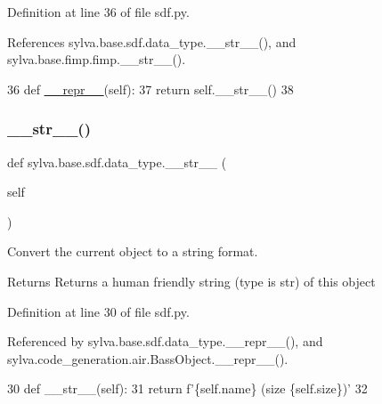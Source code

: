 Definition at line 36 of file sdf.\+py.



References sylva.\+base.\+sdf.\+data\+\_\+type.\+\_\+\+\_\+str\+\_\+\+\_\+(), and sylva.\+base.\+fimp.\+fimp.\+\_\+\+\_\+str\+\_\+\+\_\+().


\begin{DoxyCode}
36         \textcolor{keyword}{def }\hyperlink{namespacesylva_1_1code__generation_1_1floorplanner_a84f24b1e40f5425e9bb40ab45ccbd10f}{\_\_repr\_\_}(self):
37             \textcolor{keywordflow}{return} self.\_\_str\_\_()
38 
\end{DoxyCode}
\mbox{\label{classsylva_1_1base_1_1sdf_1_1data__type_a5782362238cdc10794b96462c2753de5}} 
\subsubsection{\texorpdfstring{\+\_\+\+\_\+str\+\_\+\+\_\+()}{\_\_str\_\_()}}
{\footnotesize\ttfamily def sylva.\+base.\+sdf.\+data\+\_\+type.\+\_\+\+\_\+str\+\_\+\+\_\+ (\begin{DoxyParamCaption}\item[{}]{self }\end{DoxyParamCaption})}



Convert the current object to a string format. 

\begin{DoxyReturn}{Returns}
Returns a human friendly string (type is str) of this object 
\end{DoxyReturn}


Definition at line 30 of file sdf.\+py.



Referenced by sylva.\+base.\+sdf.\+data\+\_\+type.\+\_\+\+\_\+repr\+\_\+\+\_\+(), and sylva.\+code\+\_\+generation.\+air.\+Bass\+Object.\+\_\+\+\_\+repr\+\_\+\+\_\+().


\begin{DoxyCode}
30         \textcolor{keyword}{def }\_\_str\_\_(self):
31             \textcolor{keywordflow}{return} f\textcolor{stringliteral}{'\{self.name\} (size \{self.size\})'}
32 
\end{DoxyCode}
\mbox{\label{classsylva_1_1base_1_1sdf_1_1data__type_a8d60e9a84477858f04e552fb02c5a837}} 
